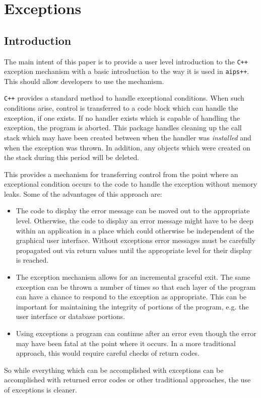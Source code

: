 \chapter{Exceptions \label{Coding.Exceptions}}
\section{Introduction}

The main intent of this paper is to provide a user level introduction to
the {\tt C++} exception mechanism with a basic introduction to the
way it is used in {\tt aips++}. This should allow developers to use the mechanism.

{\tt C++} provides a standard method to handle exceptional conditions. When
such conditions arise, control is transferred to a code block which
can handle the exception, if one exists. If no handler exists which is capable
of handling the exception, the program is aborted. This package handles 
cleaning up the call stack which may have been created between when the handler
was {\em installed} and when the exception was thrown. In addition, any
objects which were created on the stack during this period will be deleted.

This provides a mechanism for transferring control from the point where an
exceptional condition occurs to the code to handle the exception without
memory leaks. Some of the advantages of this approach are:
\begin{itemize}
\item
The code to display the error message can be moved out to the appropriate
level. Otherwise, the code to display an error message might have to be
deep within an application in a place which could otherwise be independent
of the graphical user interface. Without exceptions error messages must be 
carefully propagated out via return values until the appropriate level for 
their display is reached.
\item
The exception mechanism allows for an incremental graceful exit. The same 
exception can be thrown a number of times so that each layer of the program
can have a chance to respond to the exception as appropriate. This can be
important for maintaining the integrity of portions of the program, e.g.
the user interface or database portions.
\item
Using exceptions a program can continue after an error even though
the error may have been fatal at the point where it occurs. In a more 
traditional approach, this would require careful checks of return codes.
\end{itemize}
\noindent
So while everything which can be accomplished with exceptions can be 
accomplished with returned error codes or other traditional approaches, the
use of exceptions is cleaner.

